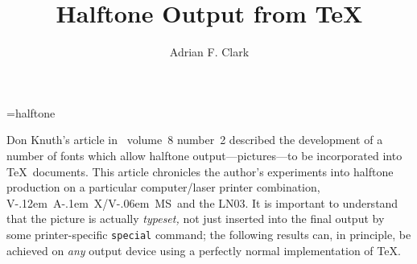 



\def\|#1|{{\tt#1}}		%
\def\cmd#1{{\tt\char92#1}}	%
\def\fig#1{Fig.~#1}		%

\def\mc{\small}			%

\def\ASCII{{\mc ASCII}}
\def\bigTeX{{big \large\TeX}}
\def\FTN{{\mc FORTRAN}}

\def\VAX{\leavevmode\hbox{V\kern-.12em A\kern-.1em X}}
\def\VMS{\leavevmode\hbox{V\kern-.06em MS}}


\nofiles
\font\halftone=halftone		%



\title{Halftone Output from \TeX}
\author{Adrian F. Clark}



   \maketitle

\noindent Don Knuth's article in \TUB\ volume~8 number~2 described the
development of a number of fonts which allow halftone
output---pictures---to be incorporated into \TeX\ documents. This
article chronicles the author's experiments into halftone production on
a particular computer/laser printer combination, \VAX/\VMS\ and the
LN03. It is important to understand that the picture is actually {\em
typeset,\/} not just inserted into the final output by some
printer-specific \cmd{special} command; the following results can, in
principle, be achieved on {\em any\/} output device using a perfectly
normal implementation of \TeX.

